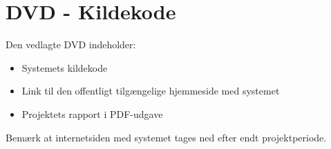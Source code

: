 \chapter{DVD - Kildekode}
\label{chap:appDVD}
Den vedlagte DVD indeholder:
	\begin{itemize}
		\item Systemets kildekode
		\item Link til den offentligt tilgængelige hjemmeside med systemet
		\item Projektets rapport i PDF-udgave
	\end{itemize}
Bemærk at internetsiden med systemet tages ned efter endt projektperiode.